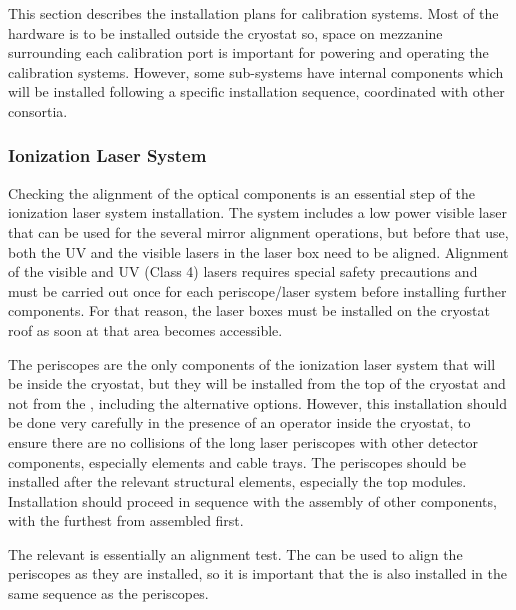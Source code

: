 
This section describes the installation plans for calibration systems. Most of the hardware is to be installed outside the cryostat so, space on mezzanine surrounding each calibration port is important for powering and operating the calibration systems. However, some sub-systems have internal components which will be installed %
following a specific installation sequence, coordinated with other consortia.

\subsubsection{Ionization Laser System} 
 
Checking the alignment of the optical components is an essential step of the ionization laser system installation. The system includes a low power visible laser that can be used for the several mirror alignment operations, but before that use, both the UV and the visible lasers in the laser box need to be aligned.
Alignment of the visible and UV (Class 4) lasers requires special safety precautions and must be carried out once for each periscope/laser system before installing further  components. For that reason, the laser boxes must be installed on the cryostat roof as soon at that area becomes accessible.  
 
The periscopes are the only components of the ionization laser system that will be inside the cryostat, but they will be installed from the top of the cryostat and not from the , including the alternative options. However, this installation should be done very carefully in the presence of an operator inside the cryostat, to ensure there are no collisions of the long laser periscopes with other detector components, especially  elements and  cable trays.
The periscopes should be installed after the relevant structural elements, especially the top  modules. Installation should proceed in sequence with the assembly of other components, with the furthest from  assembled first.

The relevant  is essentially an alignment test.
The  can be used to align the periscopes as they are installed, so it is important that the  is also installed in the same sequence as the periscopes.





